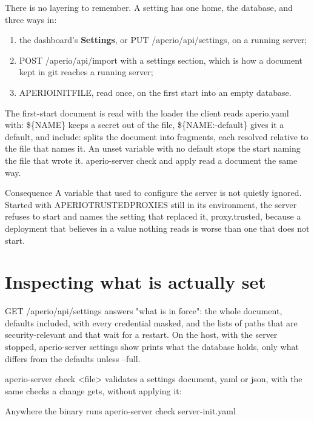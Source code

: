 \documentclass[11pt,a4paper,oneside]{book}
\newcommand{\aperiobreakableunderscore}{\textunderscore\allowbreak}
\newcommand{\aperiocodebreaks}{\XeTeXinterchartokenstate=1 }
\newcommand{\aperiocodebreaks}{}
\DeclareRobustCommand{\code}[1]{{\ttfamily\small\aperiocodebreaks
  \let\_\aperiobreakableunderscore#1}}
\begin{document}
There is no layering to remember. A setting has one home, the database, and
three ways in:

\begin{enumerate}[leftmargin=1.5em]
  \item the dashboard's \textbf{Settings}, or \code{PUT /aperio/api/settings},
  on a running server;
  \item \code{POST /aperio/api/import} with a \code{settings} section, which is
  how a document kept in git reaches a running server;
  \item \code{APERIO\_INIT\_FILE}, read once, on the first start into an empty
  database.
\end{enumerate}

The first-start document is read with the loader the client reads
\code{aperio.yaml} with: \code{\$\{NAME\}} keeps a secret out of the file,
\code{\$\{NAME:-default\}} gives it a default, and \code{include:} splits the
document into fragments, each resolved relative to the file that names it.
An unset variable with no default stops the start naming the file that wrote
it. \code{aperio-server check} and \code{apply} read a document the same way.

\begin{aperionote}{Consequence}
A variable that used to configure the server is not quietly ignored. Started
with \code{APERIO\_TRUSTED\_PROXIES} still in its environment, the server
refuses to start and names the setting that replaced it, \code{proxy.trusted},
because a deployment that believes in a value nothing reads is worse than one
that does not start.
\end{aperionote}

\section{Inspecting what is actually set}

\code{GET /aperio/api/settings} answers "what is in force": the whole
document, defaults included, with every credential masked, and the lists of
paths that are security-relevant and that wait for a restart. On the host,
with the server stopped, \code{aperio-server settings show} prints what the
database holds, only what differs from the defaults unless \code{--full}.

\code{aperio-server check <file>} validates a settings document, yaml or
json, with the same checks a change gets, without applying it:

\begin{codecard}[aperiosh]{Anywhere the binary runs}
aperio-server check server-init.yaml
\end{codecard}
\end{document}
